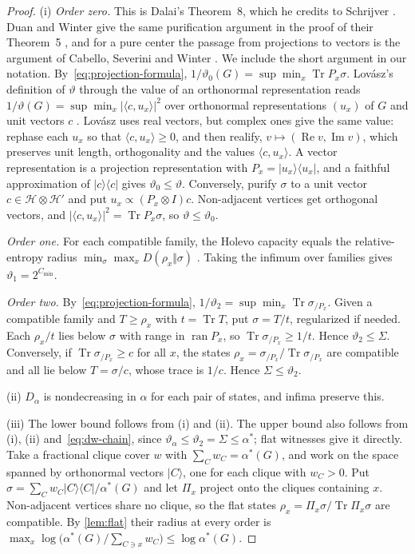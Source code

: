 \documentclass[11pt]{article}
\theoremstyle{definition}
\DeclareMathOperator{\Tr}{Tr}
\DeclareMathOperator{\ran}{ran}
\newcommand{\vt}{\vartheta}
\newcommand{\cH}{\mathcal H}
\newcommand{\Cmin}{C_{\min}}
\newcommand{\ket}[1]{\lvert #1\rangle}
\newcommand{\bra}[1]{\langle #1\rvert}
\newcommand{\proj}[1]{\ket{#1}\!\bra{#1}}
\begin{document}
\begin{proof}
(i) \emph{Order zero.}  This is Dalai's Theorem~8, which he credits to
Schrijver \cite{Dalai2013TIT}.  Duan and Winter give the same purification
argument in the proof of their Theorem~5 \cite[Section~V]{DuanWinter2016},
and for a pure center the passage from projections to vectors is the
argument of Cabello, Severini and Winter \cite[proof of Eq.~(6)]{CSW2010}.
We include the short argument in our notation.
By~\eqref{eq:projection-formula},
$1/\vt_0(G)=\sup\min_x\Tr P_x\sigma$.  Lov\'asz's definition of $\vt$
through the value of an orthonormal representation reads
$1/\vt(G)=\sup\min_x|\langle c,u_x\rangle|^2$ over orthonormal
representations $(u_x)$ of $G$ and unit vectors $c$
\cite[Section~II]{Lovasz1979}.  Lov\'asz uses real vectors, but complex ones
give the same value: rephase each $u_x$ so that $\langle c,u_x\rangle\ge0$,
and then realify, $v\mapsto(\operatorname{Re}v,\operatorname{Im}v)$, which
preserves unit length, orthogonality and the values $\langle c,u_x\rangle$.  A
vector representation is a projection representation with $P_x=\proj{u_x}$,
and a faithful approximation of $\proj c$ gives $\vt_0\le\vt$.  Conversely,
purify $\sigma$ to a unit vector $c\in\cH\otimes\cH'$ and put
$u_x\propto(P_x\otimes I)c$.  Non-adjacent vertices get orthogonal vectors,
and $|\langle c,u_x\rangle|^2=\Tr P_x\sigma$, so $\vt\le\vt_0$.

\emph{Order one.}  For each compatible family, the Holevo capacity equals the
relative-entropy radius $\min_\sigma\max_xD(\rho_x\Vert\sigma)$
\cite{OhyaPetzWatanabe1997,SchumacherWestmoreland2001}.  Taking the infimum
over families gives $\vt_1=2^{\Cmin}$.

\emph{Order two.}  By~\eqref{eq:projection-formula},
$1/\vt_2=\sup\min_x\Tr\sigma_{/P_x}$.  Given a compatible family and $T\ge\rho_x$
with $t=\Tr T$, put $\sigma=T/t$, regularized if needed.  Each $\rho_x/t$ lies
below $\sigma$ with range in $\ran P_x$, so $\Tr\sigma_{/P_x}\ge1/t$.  Hence
$\vt_2\le\Sigma$.  Conversely, if $\Tr\sigma_{/P_x}\ge c$ for all $x$, the
states $\rho_x=\sigma_{/P_x}/\Tr\sigma_{/P_x}$ are compatible and all lie below
$T=\sigma/c$, whose trace is $1/c$.  Hence $\Sigma\le\vt_2$.

(ii) $D_\alpha$ is nondecreasing in $\alpha$ for each pair of states, and
infima preserve this.

(iii) The lower bound follows from (i) and (ii).  The upper bound also
follows from (i), (ii) and~\eqref{eq:dw-chain}, since
$\vt_\alpha\le\vt_2=\Sigma\le\alpha^*$; flat witnesses give it directly.
Take a
fractional clique cover $w$ with $\sum_Cw_C=\alpha^*(G)$, and work on the
space spanned by orthonormal vectors $\ket C$, one for each clique with
$w_C>0$.  Put $\sigma=\sum_Cw_C\proj C/\alpha^*(G)$ and let $\Pi_x$ project
onto the cliques containing $x$.  Non-adjacent vertices share no clique, so the
flat states $\rho_x=\Pi_x\sigma/\Tr\Pi_x\sigma$ are compatible.  By
\cref{lem:flat} their radius at every order is
$\max_x\log\bigl(\alpha^*(G)/\sum_{C\ni x}w_C\bigr)\le\log\alpha^*(G)$.
\end{proof}
\end{document}
